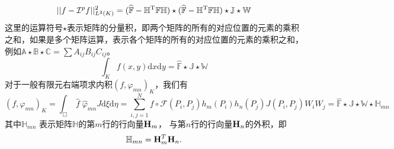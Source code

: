 \documentclass[10pt,reqno, final]{ctexartutf8}
\begin{document}
\begin{equation}%
  || f - \mathcal I^p f ||_{L^2(K)} ^2 = (\mathbb{\widehat F} - \mathbb{H}^{\rm T}\mathbb{F} \mathbb{H}) \star(\mathbb{\widehat F} - \mathbb{H}^{\rm T}\mathbb{F} \mathbb{H}) \star \mathbb{J}\star \mathbb{W}
\end{equation}
这里的运算符号$\star$表示矩阵的分量积，即两个矩阵的所有的对应位置的元素的乘积之和，如果是多个矩阵运算，表示各个矩阵的所有的对应位置的元素的乘积之和，例如$\mathbb{A}\star\mathbb{B}\star\mathbb{C} = \sum A_{ij}B_{ij}C_{ij}$。\\
\begin{equation*}
  \int_K f(x,y) \text{d}x\text{d}y = \mathbb{\widehat F} \star \mathbb{J}\star \mathbb{W}
\end{equation*}
对于一般有限元右端项求内积$(f,\varphi_{mn})_K$，我们有
\begin{equation*}
 (f,\varphi_{mn})_K = \int_{\Box} \ \widehat f \;\widehat{\varphi}_{mn} J \text{d}\xi\text{d}\eta
 = \sum_{i,j=1}^{N} f\circ\mathscr F(P_i, P_j)   h_m(P_i)h_n(P_j) J(P_i, P_j)W_iW_j
 = \mathbb{\widehat F} \star \mathbb{J}\star \mathbb{W} \star \mathbb{H}_{mn}
\end{equation*}
其中$\mathbb{H}_{mn}$ 表示矩阵$\mathbb{H}$的第$m$行的行向量${\bf H}_m$， 与第$n$行的行向量${\bf H}_n$的外积，即
\[\mathbb{H}_{mn} = {\bf H}_m^T {\bf H}_n.\]
\end{document}
